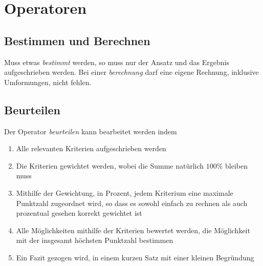 \documentclass{article}
\begin{document}
\section{Operatoren} 
\subsection{Bestimmen und Berechnen}
Muss etwas \emph{bestimmt} werden, so muss nur der Ansatz und das Ergebnis aufgeschrieben werden. Bei einer \emph{berechnung} darf eine eigene Rechnung, inklusive Umformungen, nicht fehlen.
 
\subsection{Beurteilen} 
Der Operator \emph{beurteilen} kann bearbeitet werden indem
\begin{enumerate}
 \item Alle relevanten Kriterien aufgeschrieben werden
 \item Die Kriterien gewichtet werden, wobei die Summe natürlich $100\%$ bleiben muss
 \item Mithilfe der Gewichtung, in Prozent, jedem Kriterium eine maximale Punktzahl zugeordnet wird, so dass es sowohl einfach zu rechnen als auch prozentual gesehen korrekt gewichtet ist 
 \item Alle Möglichkeiten mithilfe der Kriterien bewertet werden, die Möglichkeit mit der insgesamt höchsten Punktzahl bestimmen
 \item Ein Fazit gezogen wird, in einem kurzen Satz mit einer kleinen Begründung 
\end{enumerate} 
\end{document}
